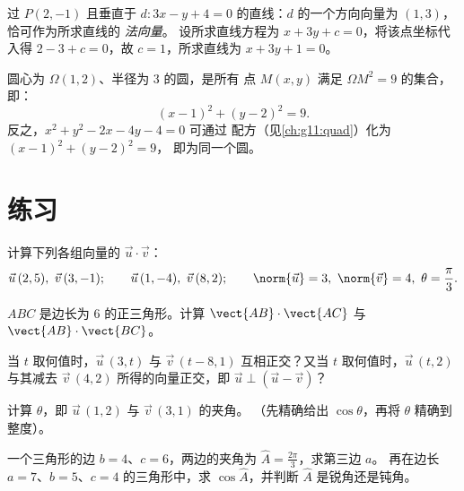 \begin{example}\label{ex:g11:scal:perpline}
过 $P(2, -1)$ 且垂直于 $d : 3x - y + 4 = 0$ 的直线：$d$ 的一个方向向量为
$(1, 3)$，恰可作为所求直线的 \emph{法向量}。
设所求直线方程为 $x + 3y + c = 0$，将该点坐标代入得
$2 - 3 + c = 0$，故 $c = 1$，所求直线为 $x + 3y + 1 = 0$。
\end{example}

\begin{example}[圆的方程]\label{ex:g11:scal:circle}
圆心为 $\Omega(1, 2)$、半径为 $3$ 的圆，是所有
点 $M(x,y)$ 满足 $\Omega M^2 = 9$ 的集合，即：
\[
(x - 1)^2 + (y - 2)^2 = 9 .
\]
反之，$x^2 + y^2 - 2x - 4y - 4 = 0$ 可通过
配方（见\cref{ch:g11:quad}）化为 $(x-1)^2 + (y-2)^2 = 9$，
即为同一个圆。
\end{example}

\section{练习}

\begin{exercise}[$\star$]\label{exo:g11:scal:1}
计算下列各组向量的 $\vec u \cdot \vec v$：
\[
\vec u\,(2, 5),\ \vec v\,(3, -1); \qquad
\vec u\,(1, -4),\ \vec v\,(8, 2); \qquad
\norm{\vec u} = 3,\ \norm{\vec v} = 4,\ \theta = \frac{\pi}{3} .
\]
\end{exercise}

\begin{exercise}[$\star$]\label{exo:g11:scal:2}
$ABC$ 是边长为 $6$ 的正三角形。计算
$\vect{AB} \cdot \vect{AC}$ 与 $\vect{AB} \cdot \vect{BC}$。
\end{exercise}

\begin{exercise}[$\star$]\label{exo:g11:scal:3}
当 $t$ 取何值时，$\vec u\,(3, t)$ 与 $\vec v\,(t - 8, 1)$
互相正交？又当 $t$ 取何值时，$\vec u\,(t, 2)$ 与其减去
$\vec v\,(4, 2)$ 所得的向量正交，即 $\vec u \perp (\vec u - \vec v)$？
\end{exercise}

\begin{exercise}[$\star$]\label{exo:g11:scal:4}
计算 $\theta$，即 $\vec u\,(1, 2)$ 与 $\vec v\,(3, 1)$ 的夹角。
（先精确给出 $\cos\theta$，再将 $\theta$ 精确到整度）。
\end{exercise}

\begin{exercise}[$\star\star$]\label{exo:g11:scal:5}
一个三角形的边 $b = 4$、$c = 6$，两边的夹角为
$\widehat A = \frac{2\pi}{3}$，求第三边 $a$。
再在边长 $a = 7$、$b = 5$、$c = 4$ 的三角形中，求
$\cos\widehat A$，并判断 $\widehat A$ 是锐角还是钝角。
\end{exercise}

